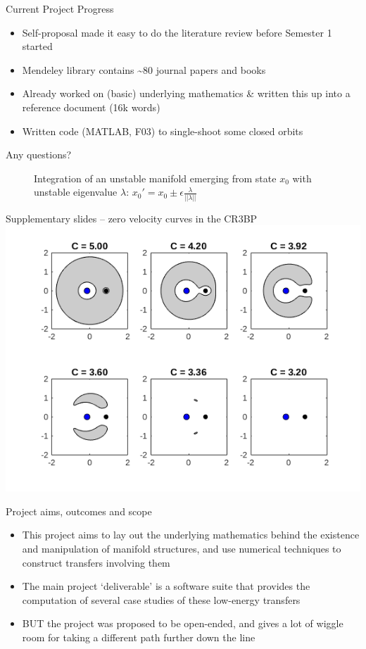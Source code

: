 \documentclass[10pt]{beamer}
\begin{document}
\begin{frame}{Current Project Progress}
	\begin{itemize}
		\item Self-proposal made it easy to do the literature review before Semester 1 started
		\item Mendeley library contains \textasciitilde 80 journal papers and books
		\item Already worked on (basic) underlying mathematics \& written this up into a reference document (16k words)
		\item Written code (MATLAB, F03) to single-shoot some closed orbits
	\end{itemize}
\end{frame}


\begin{frame}{Any questions?}
	\begin{figure}
	\centering
		\caption{Integration of an unstable manifold emerging from state $x_0$ with unstable eigenvalue $\lambda$: $x_0\prime = x_0 \pm \epsilon \frac{\lambda}{\lvert\lvert \lambda \rvert\rvert}$}
	\end{figure}
\end{frame}

\appendix

\begin{frame}{Supplementary slides -- zero velocity curves in the CR3BP}
	\centering
	\includegraphics[width=.8\linewidth]{../figures/jacobiConstantEMSys}
\end{frame}

\begin{frame}{Project aims, outcomes and scope}
	\begin{itemize}
		\item This project aims to lay out the underlying mathematics behind the existence and manipulation of manifold structures, and use numerical techniques to construct transfers involving them
		\item The main project `deliverable' is a software suite that provides the computation of several case studies of these low-energy transfers
		\item BUT the project was proposed to be open-ended, and gives a lot of wiggle room for taking a different path further down the line
	\end{itemize}
\end{frame}
\end{document}
